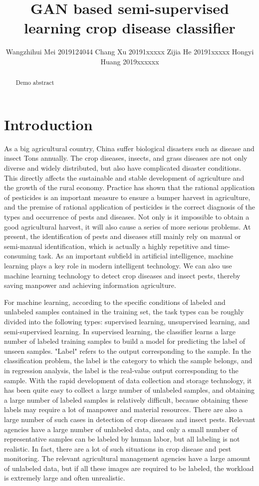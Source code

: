 \documentclass[11pt,en]{elegantpaper}
\title{GAN based semi-supervised learning crop disease classifier}
\author{Wangzhihui Mei 2019124044 Chang Xu 20191xxxxx Zijia He 20191xxxxx Hongyi Huang 2019xxxxxx}
\institute{CCNU-UOW JI}
\date{}
\begin{document}
\maketitle

\begin{abstract}
	Demo abstract
\end{abstract}

\section{Introduction}

As a big agricultural country, China suffer biological disasters such as disease and insect Tons annually. The crop diseases, insects, and grass diseases are not only diverse and widely distributed, but also have complicated disaster conditions. This directly affects the sustainable and stable development of agriculture and the growth of the rural economy. Practice has shown that the rational application of pesticides is an important measure to ensure a bumper harvest in agriculture, and the premise of rational application of pesticides is the correct diagnosis of the types and occurrence of pests and diseases. Not only is it impossible to obtain a good agricultural harvest, it will also cause a series of more serious problems. At present, the identification of pests and diseases still mainly rely on manual or semi-manual identification, which is actually a highly repetitive and time-consuming task. As an important subfield in artificial intelligence, machine learning plays a key role in modern intelligent technology. We can also use machine learning technology to detect crop diseases and insect pests, thereby saving manpower and achieving information agriculture.

For machine learning, according to the specific conditions of labeled and unlabeled samples contained in the training set, the task types can be roughly divided into the following types: supervised learning, unsupervised learning, and semi-supervised learning. In supervised learning, the classifier learns a large number of labeled training samples to build a model for predicting the label of unseen samples. "Label" refers to the output corresponding to the sample. In the classification problem, the label is the category to which the sample belongs, and in regression analysis, the label is the real-value output corresponding to the sample. With the rapid development of data collection and storage technology, it has been quite easy to collect a large number of unlabeled samples, and obtaining a large number of labeled samples is relatively difficult, because obtaining these labels may require a lot of manpower and material resources. There are also a large number of such cases in detection of crop diseases and insect pests. Relevant agencies have a large number of unlabeled data, and only a small number of representative samples can be labeled by human labor, but all labeling is not realistic. In fact, there are a lot of such situations in crop disease and pest monitoring. The relevant agricultural management agencies have a large amount of unlabeled data, but if all these images are required to be labeled, the workload is extremely large and often unrealistic.
\end{document}
